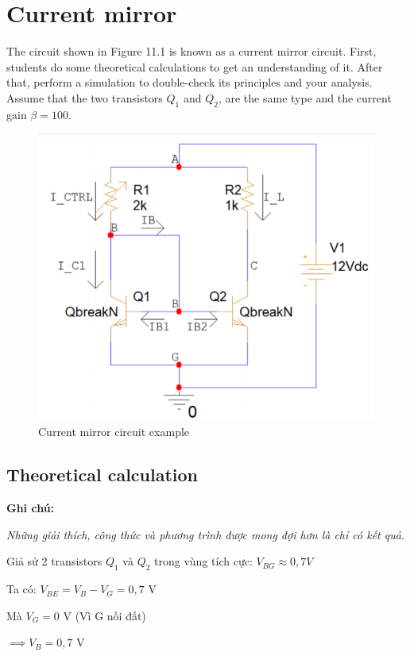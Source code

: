 \section{Current mirror}
The circuit shown in Figure 11.1 is known as a current mirror circuit. First, students do
some theoretical calculations to get an understanding of it. After that, perform a simulation to double-check its principles and your analysis. Assume that the two transistors \(Q_1\)
and \(Q_2\), are the same type and the current gain \(\beta = 100\).

\begin{figure}[ht]
    \centering
    \includegraphics[scale=0.3]{graphics/ex11/f1.png}
    \caption{Current mirror circuit example}
\end{figure}

\subsection{Theoretical calculation}

\textbf{Ghi chú:}

\textit{Những giải thích, công thức và phương trình được mong đợi hơn là chỉ có kết quả.}

Giả sử 2 transistors \(Q_1\) và \(Q_2\) trong vùng tích cực: \(V_{BG} \approx 0,7 V \)

Ta có: \(V_{BE} = V_B - V_G = 0,7\) V

 Mà \(V_G = 0\) V (Vì G nối đất)

 \( \implies V_B = 0,7\) V

